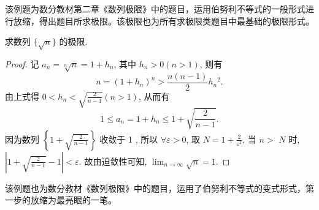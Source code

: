 \begin{analysis}
  该例题为数分教材第二章《数列极限》中的题目，运用伯努利不等式的一般形式进行放缩，得出题目所求极限。该极限也为所有求极限类题目中最基础的极限形式。
\end{analysis}


\begin{example}
  \parencite{华东师大数学分析} 求数列 $\{\sqrt{n}\}$ 的极限.
\end{example}

\begin{proof}
  记 $a_{n}=\sqrt[n]{n}=1+h_{n}$, 其中 $h_{n}>0(n>1)$, 则有
  \[n=\left(1+h_{n}\right)^{n}>\frac{n(n-1)}{2} h_{n}{ }^{2}.\]
  由上式得 $0<h_{n}<\sqrt{\frac{2}{n-1}}(n>1)$, 从而有
  \[
    1 \leq a_{n}=1+h_{n} \leq 1+\sqrt{\frac{2}{n-1}}.
  \]
  因为数列 $\left\{1+\sqrt{\frac{2}{n-1}}\right\}$ 收敛于 1 , 所以 $\forall \varepsilon>0$, 取 $N=1+\frac{2}{\varepsilon^{2}}$, 当 $n>$ $N$ 时, $\left|1+\sqrt{\frac{2}{n-1}}-1\right|<\varepsilon$. 故由迫敛性可知, $\lim _{n \rightarrow \infty} \sqrt{n}=1$.
\end{proof}

\begin{analysis}
  该例题也为数分教材《数列极限》中的题目，运用了伯努利不等式的变式形式，第一步的放缩为最亮眼的一笔。
\end{analysis}
